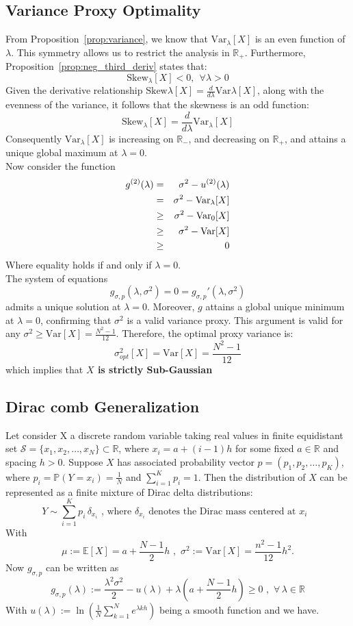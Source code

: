 \documentclass[a4paper, 10pt]{article}
\newcommand{\E}{\mathbb{E}}
\newcommand{\beq}{\begin{equation}}
\newcommand{\eeq}{\end{equation}}
\newcommand{\bea}{\begin{eqnarray}}
\newcommand{\eea}{\end{eqnarray}}
\theoremstyle{definition}
\begin{document}
\subsection{Variance Proxy Optimality}
From Proposition~\ref{prop:variance}, we know that $\text{Var}_{\lambda}[X]$ is an even function of $\lambda$. This symmetry allows us to restrict the analysis in $\mathbb{R}_+$. Furthermore, Proposition~\ref{prop:neg_third_deriv} states that: \beq \text{Skew}_{\lambda}[X] < 0 , \ \ \forall \lambda > 0\eeq Given the derivative relationship $\text{Skew}{\lambda}[X] = \frac{d}{d\lambda}\text{Var}{\lambda}[X]$, along with the evenness of the variance, it follows that the skewness is an odd function: \beq \text{Skew}_{\lambda}[X] = \frac{d}{d\lambda}\text{Var}_{\lambda}[X] \eeq
Consequently $\text{Var}_{\lambda}[X]$ is increasing on $\mathbb{R}_-$, and decreasing on $\mathbb{R_+}$, and attains a unique global maximum at $\lambda=0$.\\
Now consider the function \bea g^{(2)}(\lambda) &=& \sigma^2 - u^{(2)}(\lambda) \cr
&=& \sigma^2 - \text{Var}_{\lambda}[X] \cr
&\geq& \sigma^2 - \text{Var}_0[X] \cr
&\geq&  \sigma^2 - \text{Var}[X] \cr
&\geq& 0 \eea
Where equality holds if and only if $\lambda=0$.\\
The system of equations \beq g_{\sigma,p}(\lambda,\sigma^2)=0=g_{\sigma,p}'(\lambda,\sigma^2) \eeq admits a unique solution at $\lambda = 0$.  Moreover, $g$ attains a global unique minimum at $\lambda = 0$, confirming that $\sigma^2$ is a valid variance proxy. This argument is valid for any $\sigma^2\geq \text{Var}[X]=\frac{N^2-1}{12}$. Therefore, the optimal proxy variance is: \beq \sigma^2_{opt}[X]=\text{Var}[X]=\frac{N^2-1}{12}\eeq 
which implies that \textbf{$X$ is strictly Sub-Gaussian}

\subsection{Dirac comb Generalization}
Let consider X a discrete random variable taking real values in finite equidistant set \( \mathcal{S} = \{x_1, x_2, \ldots, x_N\} \subset \mathbb{R} \), where \( x_i = a + (i-1)h \) for some fixed \( a \in \mathbb{R} \) and spacing \( h > 0 \). Suppose \( X \) has associated probability vector \( p = (p_1, p_2, \ldots, p_K) \), where \( p_i = \mathbb{P}(Y = x_i) = \frac{1}{N}\) and \( \sum_{i=1}^K p_i = 1 \). Then the distribution of \( X \) can be represented as a finite mixture of Dirac delta distributions:
\[
Y \sim  \sum_{i=1}^K p_i \, \delta_{x_i} \text{ ,  where   } \delta_{x_i} \text{  denotes the Dirac mass centered at $x_{i}$ }
\] With
\beq \mu:=\E[X]=a + \frac{N-1}{2}h\,\,,\,\, \sigma^2:=\text{Var}[X]=\frac{n^2-1}{12}h^2. \eeq Now $g_{\sigma,p}$ can be written as \beq g_{\sigma,p}(\lambda):=\frac{\lambda^2\sigma^2}{2}-u(\lambda)+\lambda\left(a + \frac{N-1}{2}h\right) \geq 0 \,\,,\,\,  \forall \, \lambda\in \mathbb{R}\eeq With  $u(\lambda) := \ln\left(\frac{1}{N}\sum_{k=1}^{N} e^{\lambda k h}\right)$ being a smooth function and we have.\\
\end{document}
